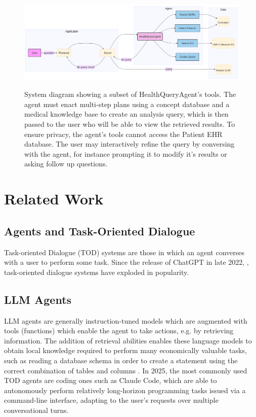 \documentclass[11pt]{article}
\begin{document}
\begin{figure}[t]
  \includegraphics[width=\linewidth]{content/system_diagram3.png}
	\label{system-diagram}
	\caption{System diagram showing a subset of HealthQueryAgent's tools. The agent must enact multi-step plans using a concept database and a medical knowledge base to create an analysis query, which is then passed to the user who will be able to view the retrieved results. To ensure privacy, the agent's tools cannot access the Patient EHR database. The user may interactively refine the query by conversing with the agent, for instance prompting it to modify it's results or asking follow up questions.}
\end{figure}

\section{Related Work}

\subsection{Agents and Task-Oriented Dialogue}
Task-oriented Dialogue (TOD) systems are those in which an agent converses with a user to perform some task.
Since the release of ChatGPT in late 2022, \cite{}, task-oriented dialogue systems have exploded in popularity.


\subsection{LLM Agents}
LLM agents are generally instruction-tuned models which are augmented with tools (functions) which enable the agent to take actions, e.g. by retrieving information.
The addition of retrieval abilities enables these language models to obtain local knowledge required to perform many economically valuable tasks, such as reading a database schema in order to create a statement using the correct combination of tables and columns \cite{ReAct}.
In 2025, the most commonly used TOD agents are coding ones such as Claude Code, which are able to autonomously perform relatively long-horizon programming tasks issued via a command-line interface, adapting to the user's requests over multiple conversational turns\cite{METR}.
\end{document}
